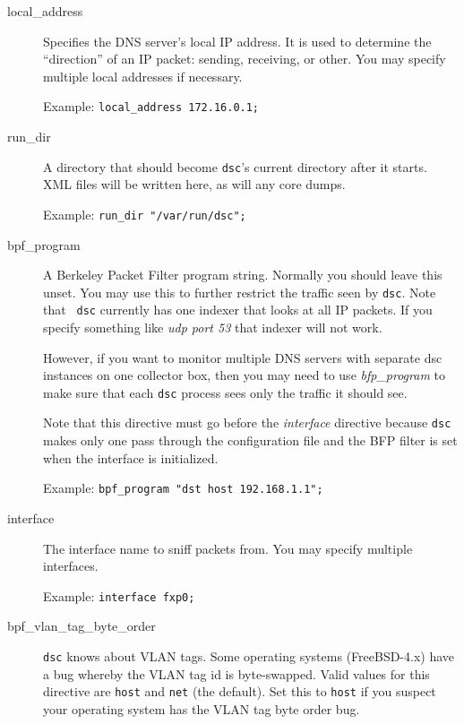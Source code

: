 \documentclass{report}
\def\dsc{{\sc dsc}}
\begin{document}
\begin{description}

\item[local\_address]

	Specifies the DNS server's local IP address.  It is used
	to determine the ``direction'' of an IP packet: sending,
	receiving, or other.  You may specify multiple local addresses
	if necessary.

	Example: {\tt local\_address 172.16.0.1;\/}

\item[run\_dir]

	A directory that should become {\tt dsc\/}'s current directory
	after it starts.  XML files will be written here, as will
	any core dumps.

	Example: {\tt run\_dir "/var/run/dsc";\/}

\item[bpf\_program]

	A Berkeley Packet Filter program string.  Normally you
	should leave this unset.  You may use this to further
	restrict the traffic seen by {\tt dsc\/}.  Note that {\tt
	dsc\/} currently has one indexer that looks at all IP
	packets.  If you specify something like {\em udp port 53\/}
	that indexer will not work.

	However, if you want to monitor multiple DNS servers with
	separate {\dsc} instances on one collector box, then you
	may need to use {\em bfp\_program} to make sure that each
	{\tt dsc} process sees only the traffic it should see.

	Note that this directive must go before the {\em interface\/}
	directive because {\tt dsc\/} makes only one pass through
	the configuration file and the BFP filter is set when the
	interface is initialized.

	Example: {\tt bpf\_program "dst host 192.168.1.1";\/}

\item[interface]

	The interface name to sniff packets from.   You may specify multiple
	interfaces.

	Example: {\tt interface fxp0;\/}

\item[bpf\_vlan\_tag\_byte\_order]

	{\tt dsc\/} knows about VLAN tags.  Some operating systems (FreeBSD-4.x) have a bug
	whereby the VLAN tag id is byte-swapped.  Valid values for this directive
	are {\tt host\/} and {\tt net\/} (the default).    Set this to {\tt host\/}
	if you suspect your operating system has the VLAN tag byte order bug.


\end{description}
\end{document}
